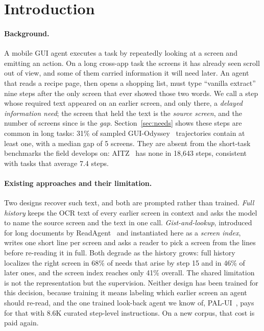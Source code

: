 \section{Introduction}

\paragraph{Background.} A mobile GUI agent executes a task by repeatedly looking at a screen and emitting an action. On a long cross-app task the screens it has already seen scroll out of view, and some of them carried information it will need later. An agent that reads a recipe page, then opens a shopping list, must type ``vanilla extract'' nine steps after the only screen that ever showed those two words. We call a step whose required text appeared on an earlier screen, and only there, a \emph{delayed information need}; the screen that held the text is the \emph{source screen}, and the number of screens since is the \emph{gap}. Section~\ref{sec:needs} shows these steps are common in long tasks: 31\% of sampled GUI-Odyssey~\citep{guiodyssey} trajectories contain at least one, with a median gap of 5 screens. They are absent from the short-task benchmarks the field develops on: AITZ~\citep{aitz} has none in 18,643 steps, consistent with tasks that average 7.4 steps.

\paragraph{Existing approaches and their limitation.} Two designs recover such text, and both are prompted rather than trained. \emph{Full history} keeps the OCR text of every earlier screen in context and asks the model to name the source screen and the text in one call. \emph{Gist-and-lookup}, introduced for long documents by ReadAgent~\citep{readagent} and instantiated here as a \emph{screen index}, writes one short line per screen and asks a reader to pick a screen from the lines before re-reading it in full. Both degrade as the history grows: full history localizes the right screen in 68\% of needs that arise by step 15 and in 46\% of later ones, and the screen index reaches only 41\% overall. The shared limitation is not the representation but the supervision. Neither design has been trained for this decision, because training it means labeling which earlier screen an agent should re-read, and the one trained look-back agent we know of, PAL-UI~\citep{palui}, pays for that with 8.6K curated step-level instructions. On a new corpus, that cost is paid again.

